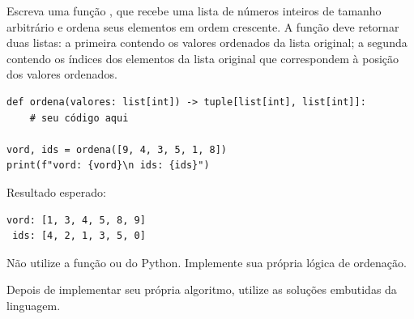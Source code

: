 Escreva uma função  , que recebe uma lista de números inteiros de tamanho arbitrário e ordena
seus elementos em ordem crescente.
A função deve retornar duas listas: a primeira contendo os valores ordenados da lista original; a segunda contendo os
índices dos elementos da lista original que correspondem à posição dos valores ordenados.

\begin{verbatim}
def ordena(valores: list[int]) -> tuple[list[int], list[int]]:
    # seu código aqui

vord, ids = ordena([9, 4, 3, 5, 1, 8])
print(f"vord: {vord}\n ids: {ids}")
\end{verbatim}

Resultado esperado:
\begin{verbatim}
vord: [1, 3, 4, 5, 8, 9]
 ids: [4, 2, 1, 3, 5, 0]
\end{verbatim}

Não utilize a função  ou  do Python.
Implemente sua própria lógica de ordenação.

Depois de implementar seu própria algoritmo, utilize as soluções embutidas da linguagem.

